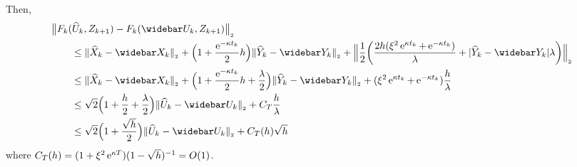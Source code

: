 Then,
\begin{equation}
	\begin{aligned}
		 & \big\Vert F_k(\widehat U_k, Z_{k+1}) - F_k(\widebar U_k, Z_{k+1}) \big\Vert_{_2}                                                                                                                                                                                                                                                  \\
		 & \qquad \leq \Vert \widehat X_k - \widebar X_k \Vert_{_2} + \Big( 1 + \frac{ \e^{- \kappa t_k}}{2} h \Big) \Vert \widehat Y_k - \widebar Y_k \Vert_{_2} + \Big\Vert \frac{1}{2} \bigg( \frac{2h ( \xi^2 \e^{\kappa t_k} + \e^{- \kappa t_k} ) }{ \lambda } + \vert \widehat Y_k - \widebar Y_k \vert \lambda \bigg) \Big\Vert_{_2} \\
		 & \qquad \leq \Vert \widehat X_k - \widebar X_k \Vert_{_2} + \Big( 1 + \frac{ \e^{- \kappa t_k}}{2} h + \frac{\lambda}{2} \Big) \Vert \widehat Y_k - \widebar Y_k \Vert_{_2} + ( \xi^2 \e^{\kappa t_k} + \e^{- \kappa t_k} ) \frac{h}{ \lambda }                                                                                    \\
		 & \qquad \leq \sqrt{2} \Big( 1 + \frac{h}{2} + \frac{\lambda}{2} \Big) \Vert \widehat U_k - \widebar U_k \Vert_{_2} + C_{T} \frac{h}{ \lambda }                                                                                                                                                                                     \\
		 & \qquad \leq \sqrt{2} \Big( 1 + \frac{\sqrt{h}}{2} \Big) \Vert \widehat U_k - \widebar U_k \Vert_{_2} + C_{T} (h) \sqrt{h}
	\end{aligned}
\end{equation}
where $C_T (h) = (1 + \xi^2 \operatorname{e}^{\kappa T}) (1-\sqrt{h})^{-1} = O(1)$.


